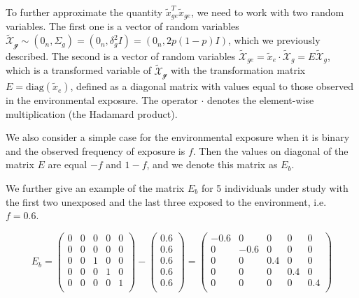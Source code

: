 \documentclass[]{book}
\theoremstyle{definition}
\theoremstyle{definition}
\theoremstyle{definition}
\theoremstyle{remark}
\begin{document}
To further approximate the quantity \(\tilde{x}_{ge}^T \tilde{x}_{ge}\),
we need to work with two random variables. The first one is a vector of
random variables
\(\mathcal{\tilde{X}_g} \sim (0_n, \Sigma_g) = (0_n, \delta_g^2 I) = (0_n, 2 p (1-p) I)\),
which we previously described. The second is a vector of random
variables
\(\mathcal{\tilde{X}}_{ge} = \tilde{x}_e \cdot \mathcal{\tilde{X}}_g = E \mathcal{\tilde{X}}_g\),
which is a transformed variable of \(\mathcal{\tilde{X}_g}\) with the
transformation matrix \(E = \mathrm{diag}(\tilde{x}_e)\), defined as a
diagonal matrix with values equal to those observed in the environmental
exposure. The operator \(\cdot\) denotes the element-wise multiplication
(the Hadamard product).

We also consider a simple case for the environmental exposure when it is
binary and the observed frequency of exposure is \(f\). Then the values
on diagonal of the matrix \(E\) are equal \(-f\) and \(1 - f\), and we
denote this matrix as \(E_b\).

We further give an example of the matrix \(E_b\) for 5 individuals under
study with the first two unexposed and the last three exposed to the
environment, i.e. \(f = 0.6\).

\begin{equation*} 
E_b = 
\left(\begin{array}{ccccc}
0 & 0 & 0 & 0 & 0\\
0 & 0 & 0 & 0 & 0\\
0 & 0 & 1 & 0 & 0\\
0 & 0 & 0 & 1 & 0\\
0 & 0 & 0 & 0 & 1\\
\end{array}\right)
- 
\left(\begin{array}{c}
0.6 \\
0.6 \\
0.6 \\
0.6 \\
0.6 \\
\end{array}\right)
= 
\left(\begin{array}{ccccc}
-0.6 & 0 & 0 & 0 & 0\\
0 & -0.6 & 0 & 0 & 0\\
0 & 0 & 0.4 & 0 & 0\\
0 & 0 & 0 & 0.4 & 0\\
0 & 0 & 0 & 0 & 0.4\\
\end{array}\right)
\end{equation*}
\end{document}
